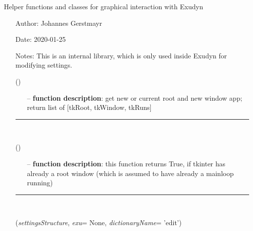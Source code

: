 \begin{itemize}[leftmargin=1.4cm]
\begin{itemize}[leftmargin=1.4cm]
\begin{itemize}[leftmargin=0.5cm]
\begin{itemize}[leftmargin=1.4cm]
\begin{itemize}[leftmargin=1.4cm]
\begin{itemize}[leftmargin=0.5cm]
\begin{itemize}[leftmargin=1.4cm]
\begin{itemize}[leftmargin=0.5cm]
%
\label{sec:module:GUI}
  Helper functions and classes for graphical interaction with Exudyn
\begin{itemize}[leftmargin=1.4cm]
\setlength{\itemindent}{-1.4cm}
\item[]Author:    Johannes Gerstmayr
\item[]Date:      2020-01-25
\item[]Notes: 	This is an internal library, which is only used inside Exudyn for modifying settings.
\ei
\begin{flushleft}
\label{sec:GUI:GetTkRootAndNewWindow}
({\it })
\end{flushleft}
\setlength{\itemindent}{0.7cm}
\begin{itemize}[leftmargin=0.7cm]
  \item[--]  {\bf function description}: get new or current root and new window app; return list of [tkRoot, tkWindow, tkRuns]\vspace{12pt}\end{itemize}
%
\noindent\rule{8cm}{0.75pt}\vspace{1pt} \\ 
\begin{flushleft}
\label{sec:GUI:TkRootExists}
({\it })
\end{flushleft}
\setlength{\itemindent}{0.7cm}
\begin{itemize}[leftmargin=0.7cm]
  \item[--]  {\bf function description}: this function returns True, if tkinter has already a root window (which is assumed to have already a mainloop running)\vspace{12pt}\end{itemize}
%
\noindent\rule{8cm}{0.75pt}\vspace{1pt} \\ 
\begin{flushleft}
\label{sec:GUI:EditDictionaryWithTypeInfo}
({\it settingsStructure}, {\it exu}= None, {\it dictionaryName}= 'edit')
\end{flushleft}
\setlength{\itemindent}{0.7cm}
\begin{itemize}[leftmargin=0.7cm]

\end{itemize}
\end{itemize}
\end{itemize}
\end{itemize}
\end{itemize}
\end{itemize}
\end{itemize}
\end{itemize}
\end{itemize}
\end{itemize}
